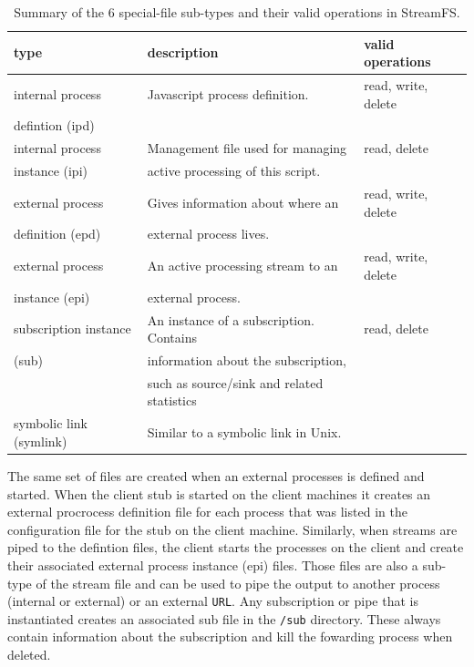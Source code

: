 \begin{table}[h]
\begin{center}
\begin{tabular}{| l | l | l |}
	\hline
	\textbf{type} & \textbf{description} & \textbf{valid operations} \\ \hline
	
	internal process  & Javascript process definition.  & read, write, delete  \\ 
	defintion (ipd)   & 							    &	\\ \hline

	internal process  & Management file used for managing & read, delete \\
	instance (ipi)	  & active processing of this script. & \\ \hline

	external process  & Gives information about where an & read, write, delete \\
	definition (epd)  & external process lives. &\\ \hline

	external process  & An active processing stream to an  & read, write, delete \\
	instance (epi)	  & external process. &\\ \hline

	subscription instance & An instance of a subscription.  Contains & read, delete \\
				(sub) 	  & information about the subscription, &\\
								& such as source/sink and related statistics &\\ \hline
								
	symbolic link (symlink) & Similar to a symbolic link in Unix. & \\
	\hline
\end{tabular}
\caption{Summary of the 6 special-file sub-types and their valid operations in StreamFS.}
\label{tab:filesubtypes}
\end{center}
\end{table}

The same set of files are created when an external processes is defined and started.  When the client stub is started on the client
machines it creates an external procrocess definition file for each process that was listed in the configuration file for the stub on 
the client machine.  Similarly, when streams are piped to the defintion files, the client starts the processes on the client
and create their associated external process instance (epi) files.  Those files are also a sub-type of the stream file and can
be used to pipe the output to another process (internal or external) or an external \texttt{URL}.
Any subscription or pipe that is instantiated creates an associated sub file in the \texttt{/sub} directory.  These always contain information
about the subscription and kill the fowarding process when deleted.

